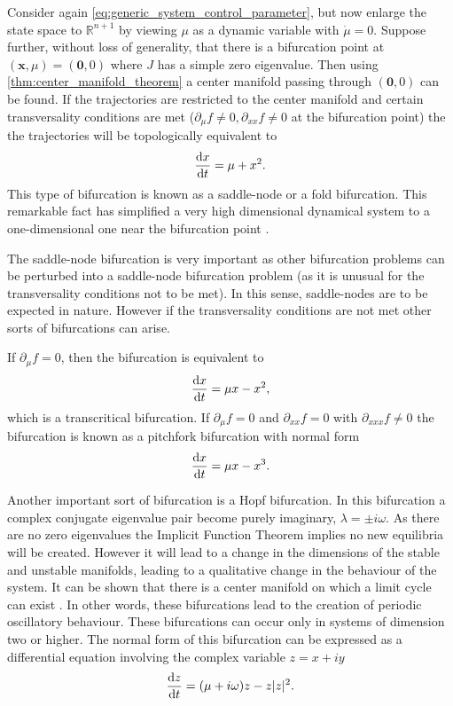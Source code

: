 Consider again \cref{eq:generic_system_control_parameter}, but now enlarge the state space to $\mathbb{R}^{n+1}$ by viewing $\mu$ as a dynamic variable with $\dot{\mu} = 0$. Suppose
further, without loss of generality, that there is a bifurcation point at $(\bm{x},\mu)  = (\bm{0},0)$ where $J$ has a simple zero eigenvalue.
Then using \cref{thm:center_manifold_theorem} a center manifold passing through
$(\bm{0},0)$ can be found. If the trajectories are restricted to the center manifold and certain transversality conditions are met ($\partial_{\mu}f \neq 0,\partial_{xx} f\neq 0$ at the
bifurcation point) the the trajectories will be topologically equivalent \parencite{guckenheimer2013} to
\begin{equation}
  \label{eq:saddle_node}
  \dv{x}{t}  = \mu + x^2.
\end{equation}
This type of bifurcation is known as a saddle-node or a fold bifurcation.
This remarkable fact has simplified a very high dimensional dynamical system to a one-dimensional one near the bifurcation point \parencite{Glendinning1994}.

The saddle-node bifurcation is very important as other bifurcation problems can be perturbed into a saddle-node bifurcation problem (as it is unusual for the transversality conditions
not to be met). In this sense, saddle-nodes are to be expected in nature. However if the transversality conditions are not met other sorts of bifurcations can arise.

If $\partial_{\mu}f=0$, then the bifurcation is equivalent to
\begin{equation}
  \label{eq:transcritical}
  \dv{x}{t} = \mu x - x^2,
\end{equation}
which is a transcritical bifurcation. If $\partial_{\mu}f = 0$ and $\partial_{xx}f=0$ with $\partial_{xxx}f \neq 0$ the bifurcation is known as a pitchfork bifurcation with normal form
\begin{equation}
  \label{eq:pitchfork}
  \dv{x}{t} = \mu x - x^3.
\end{equation}

Another important sort of bifurcation is a Hopf bifurcation. In this bifurcation a complex conjugate eigenvalue pair become purely imaginary, $\lambda = \pm i\omega$.
As there are no zero eigenvalues the Implicit Function Theorem implies no new equilibria will be created. However it will lead to a change in the dimensions of the
stable and unstable manifolds, leading to a qualitative change in the behaviour of the system. It can be shown that there is a center manifold on which a limit cycle can exist
\parencite{guckenheimer2013}. In other words, these bifurcations lead to the creation of periodic oscillatory behaviour. These bifurcations
can occur only in systems of dimension two or higher. The normal form of this bifurcation \parencite{guckenheimer2013} can be expressed as a differential equation involving the complex variable $z = x + iy$
\begin{equation}
  \label{eq:hopf}
  \dv{z}{t} = (\mu + i \omega) z - z|z|^2.
\end{equation}

